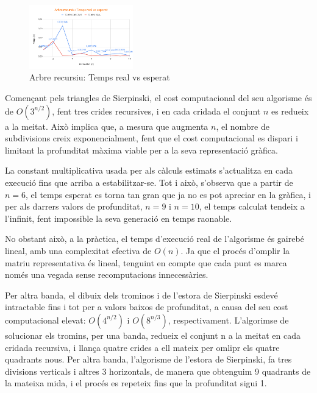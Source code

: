 \documentclass{ieeetj}
\begin{document}
\begin{figure}[H]
\centerline{\includegraphics[width=0.4\textwidth]{docs/png/Arbre recursiu_ Temps real vs esperat.png}}
\caption{Arbre recursiu: Temps real vs esperat}
\label{fig:int2}
\end{figure}

Començant pels triangles de Sierpinski, el cost computacional del seu algorisme és de \( O(3^{n/2}) \), fent tres crides recursives, i en cada cridada el conjunt \( n \) es redueix a la meitat. Això implica que, a mesura que augmenta \( n \), el nombre de subdivisions creix exponencialment, fent que el cost computacional es dispari i limitant la profunditat màxima viable per a la seva representació gràfica.\newline

La constant multiplicativa usada per als càlculs estimats s'actualitza en cada execució fins que arriba a estabilitzar-se. Tot i això, s'observa que a partir de \( n = 6 \), el temps esperat es torna tan gran que ja no es pot apreciar en la gràfica, i per als  darrers valors de profunditat, \( n = 9 \) i \( n = 10 \), el temps calculat tendeix a l'infinit, fent impossible la seva generació en temps raonable.

No obstant això, a la pràctica, el temps d'execució real de l'algorisme és gairebé lineal, amb una complexitat efectiva de \( O(n) \). Ja que el procés d'omplir la matriu representativa és lineal, tenguint en compte que cada punt es marca només una vegada sense recomputacions innecessàries.\newline

Per altra banda, el dibuix dels trominos i de l'estora de Sierpinski esdevé intractable fins i tot per a valors baixos de profunditat, a causa del seu cost computacional elevat: \( O(4^{n/2}) \) i \( O(8^{n/3}) \), respectivament. L'algorimse de solucionar els tromins, per una banda, redueix el conjunt n a la meitat en cada cridada recursiva, i llança quatre crides a ell mateix per omlipr els  quatre quadrants nous. Per altra banda, l'algorisme de l'estora de Sierpinski, fa tres divisions verticals i altres 3 horizontals, de manera que obtenguim 9 quadrants de la mateixa mida, i el procés es repeteix fins que la profunditat sigui 1.\newline 
\end{document}
